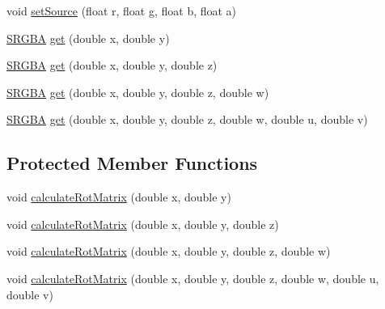 \begin{DoxyCompactItemize}
\item 
void \hyperlink{classanl_1_1CRGBARotateColor_aebd3b5df58077c276e95564501f014a1}{setSource} (float r, float g, float b, float a)
\item 
\hyperlink{structanl_1_1SRGBA}{SRGBA} \hyperlink{classanl_1_1CRGBARotateColor_a14d2e43da4ad85d88b6bfce5e5cafcae}{get} (double x, double y)
\item 
\hyperlink{structanl_1_1SRGBA}{SRGBA} \hyperlink{classanl_1_1CRGBARotateColor_a8dbecf4dacad0814addb213cbd83b6cc}{get} (double x, double y, double z)
\item 
\hyperlink{structanl_1_1SRGBA}{SRGBA} \hyperlink{classanl_1_1CRGBARotateColor_a543b68b45b188b430f57fe645ac3e3c6}{get} (double x, double y, double z, double w)
\item 
\hyperlink{structanl_1_1SRGBA}{SRGBA} \hyperlink{classanl_1_1CRGBARotateColor_a2a41a9e088707832997a0a515bf87e19}{get} (double x, double y, double z, double w, double u, double v)
\end{DoxyCompactItemize}
\subsection*{Protected Member Functions}
\begin{DoxyCompactItemize}
\item 
void \hyperlink{classanl_1_1CRGBARotateColor_a198971009099113094d7da3fa774adf6}{calculateRotMatrix} (double x, double y)
\item 
void \hyperlink{classanl_1_1CRGBARotateColor_a8cee6d45519158e48b0f04d05ccf1c16}{calculateRotMatrix} (double x, double y, double z)
\item 
void \hyperlink{classanl_1_1CRGBARotateColor_a89534b2e30b2c5951d588d133e8b0909}{calculateRotMatrix} (double x, double y, double z, double w)
\item 
void \hyperlink{classanl_1_1CRGBARotateColor_a828e5dc631081f7f891611b73fafb824}{calculateRotMatrix} (double x, double y, double z, double w, double u, double v)
\end{DoxyCompactItemize}
